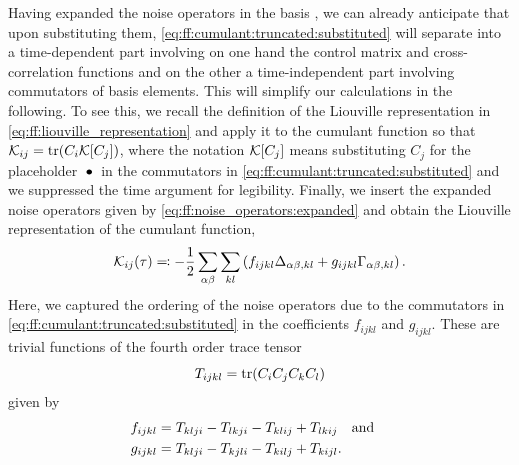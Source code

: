 Having expanded the noise operators in the basis \basis, we can already anticipate that upon substituting them, \cref{eq:ff:cumulant:truncated:substituted} will separate into a time-dependent part involving on one hand the control matrix and cross-correlation functions and on the other a time-independent part involving commutators of basis elements.
This will simplify our calculations in the following.
To see this, we recall the definition of the Liouville representation in \cref{eq:ff:liouville_representation} and apply it to the cumulant function so that $\mathcal{K}_{ij} = \tr(C_i\mathcal{K}[C_j])$, where the notation $\mathcal{K}[C_j]$ means substituting $C_j$ for the placeholder $\:\bullet\:$ in the commutators in \cref{eq:ff:cumulant:truncated:substituted} and we suppressed the time argument for legibility.
Finally, we insert the expanded noise operators given by \cref{eq:ff:noise_operators:expanded} and obtain the Liouville representation of the cumulant function,
\begin{equation}
    \mathcal{K}_{ij}(\tau) \eqqcolon -\frac{1}{2}\sum_{\alpha\beta} \sum_{kl}\left(
                                                                                  f_{ijkl}\Delta_{\alpha\beta,kl} + g_{ijkl}\Gamma_{\alpha\beta,kl}
    \right). \label{eq:ff:cumulant:truncated:liouville}
\end{equation}
Here, we captured the ordering of the noise operators due to the commutators in \cref{eq:ff:cumulant:truncated:substituted} in the coefficients $f_{ijkl}$ and $g_{ijkl}$.
These are trivial functions of the fourth order trace tensor
\begin{equation}\label{eq:ff:trace_tensor}
T_{ijkl} = \tr(C_i C_j C_k C_l)
\end{equation}
given by
\begin{subequations}
    \begin{align}\label{eq:ff:structure_constants}
    f_{ijkl} &= T_{klji} - T_{lkji} - T_{klij} + T_{lkij}\qand \\
    g_{ijkl} &= T_{klji} - T_{kjli} - T_{kilj} + T_{kijl}.
    \end{align}
\end{subequations}
